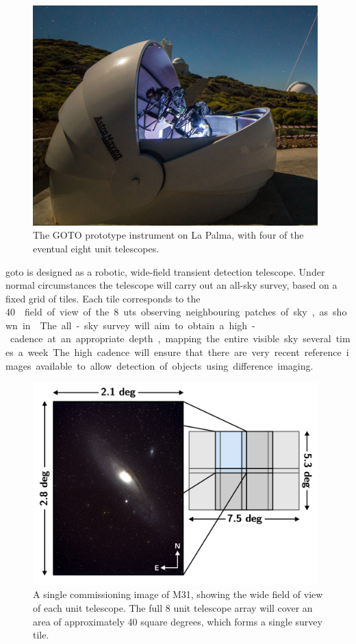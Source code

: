 \begin{colsection}
\begin{colsection}
\begin{figure}[t]
    \begin{center}
        \includegraphics[width=11cm]{images/goto_photo.jpg}
    \end{center}
    \caption[The GOTO prototype instrument]{
        The GOTO prototype instrument on La Palma, with four of the eventual eight unit telescopes.
    }\label{fig:goto_photo}
\end{figure}

\gls{goto} is designed as a robotic, wide-field transient detection telescope. Under normal circumstances the telescope will carry out an all-sky survey, based on a fixed grid of tiles. Each tile corresponds to the \SI{40}{\square\deg} field of view of the 8 \glspl{ut} observing neighbouring patches of sky, as shown in . The all-sky survey will aim to obtain a high-cadence at an appropriate depth, mapping the entire visible sky several times a week. The high cadence will ensure that there are very recent reference images available to allow detection of objects using difference imaging.

\begin{figure}[t]
    \begin{center}
        \includegraphics[width=11cm]{images/tiles.pdf}
    \end{center}
    \caption[M31]{
        A single commissioning image of M31, showing the wide field of view of each unit telescope. The full 8 unit telescope array will cover an area of approximately 40 square degrees, which forms a single survey tile.
    }\label{fig:tiles}
\end{figure}


\end{colsection}
\end{colsection}
